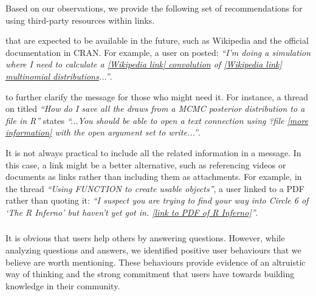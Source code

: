     Based on our observations, we provide the following set of recommendations for using third-party resources within links.

    \begin{description}[itemsep=3pt, topsep=2pt, leftmargin=1em, parsep=0pt]
        \item[Use well-maintained Websites] that are expected to be available in the future, such as Wikipedia and the official documentation in CRAN.
        For example, %
        a user on \SO posted: \textit{``I'm doing a simulation where I need to calculate a \href{https://en.wikipedia.org/wiki/Convolution_of_probability_distributions}{[Wikipedia link] convolution} of
          \href{https://en.wikipedia.org/wiki/Multinomial_distribution}{[Wikipedia link] multinomial distributions}...''}.

        \item[Use resources that support or expand the message] to further clarify the message for those who might need it. For instance, a thread on \SO titled \textit{``How do I save all the draws from a MCMC posterior distribution to a file in R''} states \textit{``...You should be able to open a text connection using ?file \href{http://stat.ethz.ch/R-manual/R-devel/library/base/html/connections.html}{[more information]} with the open argument set to write...''}.

        \item[What to do when material relevant to the message is too big.] It is not always practical to include all the related information in a message. In this
          case, a link might be a better alternative, such as referencing videos or documents as links rather than including them as attachments.
        For example, in the \RH thread \textit{``Using FUNCTION to create usable objects''}, a user linked to a PDF rather than quoting it: \textit{``I suspect you are trying to find your way
          into Circle 6 of `The R Inferno' but haven't yet got in. \href{http://www.burns-stat.com/pages/Tutor/R\_inferno.pdf}{[link to PDF of R Inferno]}''}.
    \end{description}

\subsubsection{\rece}
\label{sec:userbeh}

It is obvious that users help others by answering questions. However, while analyzing questions and answers, we identified positive user behaviours that
we believe are worth mentioning.  These behaviours provide evidence of an altruistic way of thinking and the strong commitment that users have towards building knowledge in their community.

